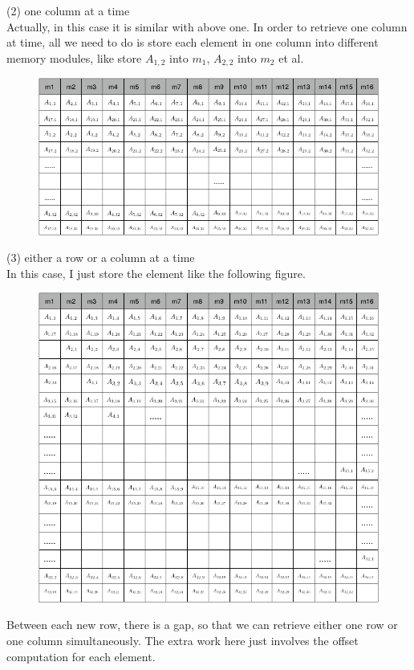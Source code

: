 \documentclass[12pt]{report}
\begin{document}
(2) one column at a time \\
Actually, in this case it is similar with above one. In order to retrieve one column at time, all we need to do is store each element in one column into different memory modules, like store $A_{1,2}$ into $m_{1}$, $A_{2,2}$ into $m_{2}$ et al. \\
\begin{figure}[]
\begin{center}
\includegraphics[scale=0.5]{column.png}
\end{center}
\end{figure}
(3) either a row or a column at a time \\
In this case, I just store the element like the following figure.
\begin{figure}[]
\begin{center}
\includegraphics[scale=0.5]{row_column.png}
\end{center}
\end{figure}
Between each new row, there is a gap, so that we can retrieve either one row or one column simultaneously. The extra work here just involves the offset computation for each element.
\end{document}

